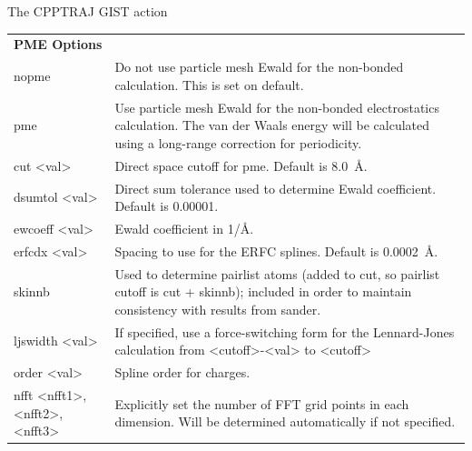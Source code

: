 \documentclass[9pt,tutorial]{livecoms}
\begin{document}
\begin{Checklists*}[h!]
\begin{checklist}{The CPPTRAJ GIST action}
\begin{tabularx}{\textwidth}{@{}l X @{} }
\textbf{PME Options} & \\
nopme & Do not use particle mesh Ewald for the non-bonded calculation. This is set  on default. \\
pme & Use particle mesh Ewald for the non-bonded electrostatics calculation. The van der Waals energy will be calculated using a long-range correction for periodicity.\\
\qquad cut <val> & Direct space cutoff for pme. Default is \qty{8.0}{\angstrom}.\\
\qquad dsumtol <val> & Direct sum tolerance used to determine Ewald coefficient. Default is 0.00001.\\
\qquad ewcoeff <val> & Ewald coefficient in 1/Å. \\
\qquad erfcdx <val> & Spacing to use for the ERFC splines. Default is \qty{0.0002}{\angstrom}. \\
\qquad skinnb & Used to determine pairlist atoms (added to cut, so pairlist cutoff is cut + skinnb); included in order to maintain consistency with results from sander. \\
\qquad ljswidth <val> & If specified, use a force-switching form for the Lennard-Jones calculation from <cutoff>-<val> to <cutoff> \\
\qquad order <val> & Spline order for charges. \\
\qquad nfft <nfft1>,<nfft2>,<nfft3> & Explicitly set the
number of FFT grid points in each dimension.
Will be determined automatically if not
specified. \\

\end{tabularx}  
\end{checklist}
\end{Checklists*}
\end{document}

